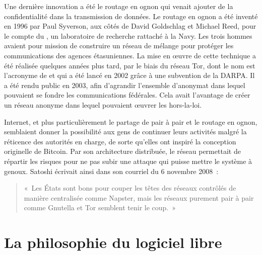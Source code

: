 Une dernière innovation a été le routage en ognon qui venait ajouter de la confidentialité dans la transmission de données. Le routage en ognon a été inventé en 1996 par Paul Syverson, aux côtés de David Goldschlag et Michael Reed, pour le compte du , un laboratoire de recherche rattaché à la Navy. Les trois hommes avaient pour mission de construire un réseau de mélange pour protéger les communications des agences étasuniennes. La mise en œuvre de cette technique a été réalisée quelques années plus tard, par le biais du réseau Tor, dont le nom est l'acronyme de  et qui a été lancé en 2002 grâce à une subvention de la DARPA. Il a été rendu public en 2003, afin d'agrandir l'ensemble d'anonymat dans lequel pouvaient se fondre les communications fédérales. Cela avait l'avantage de créer un réseau anonyme dans lequel pouvaient œuvrer les hors-la-loi.

Internet, et plus particulièrement le partage de pair à pair et le routage en ognon, semblaient donner la possibilité aux gens de continuer leurs activités malgré la réticence des autorités en charge, de sorte qu'elles ont inspiré la conception originelle de Bitcoin. Par son architecture distribuée, le réseau permettait de répartir les risques pour ne pas subir une attaque qui puisse mettre le système à genoux. Satoshi écrivait ainsi dans son courriel du 6 novembre 2008~:

\begin{quote}
«~Les États sont bons pour couper les têtes des réseaux contrôlés de manière centralisée comme Napster, mais les réseaux purement pair à pair comme Gnutella et Tor semblent tenir le coup.~»
\end{quote} %


\section*{La philosophie du logiciel libre} %

